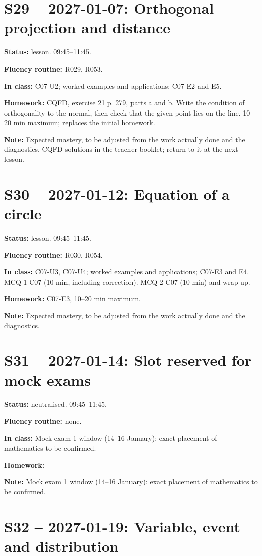 \section*{S29 -- 2027-01-07: Orthogonal projection and distance}
\textbf{Status:} lesson. 09:45–11:45.\par\textbf{Fluency routine:} R029, R053.\par\textbf{In class:} C07-U2; worked examples and applications; C07-E2 and E5. \par\textbf{Homework:} CQFD, exercise 21 p. 279, parts a and b. Write the condition of orthogonality to the normal, then check that the given point lies on the line. 10–20 min maximum; replaces the initial homework.\par\textbf{Note:} Expected mastery, to be adjusted from the work actually done and the diagnostics. CQFD solutions in the teacher booklet; return to it at the next lesson.
\section*{S30 -- 2027-01-12: Equation of a circle}
\textbf{Status:} lesson. 09:45–11:45.\par\textbf{Fluency routine:} R030, R054.\par\textbf{In class:} C07-U3, C07-U4; worked examples and applications; C07-E3 and E4.  MCQ 1 C07 (10 min, including correction). MCQ 2 C07 (10 min) and wrap-up.\par\textbf{Homework:} C07-E3, 10–20 min maximum.\par\textbf{Note:} Expected mastery, to be adjusted from the work actually done and the diagnostics.
\section*{S31 -- 2027-01-14: Slot reserved for mock exams}
\textbf{Status:} neutralised. 09:45–11:45.\par\textbf{Fluency routine:} none.\par\textbf{In class:} Mock exam 1 window (14–16 January): exact placement of mathematics to be confirmed.\par\textbf{Homework:} \par\textbf{Note:} Mock exam 1 window (14–16 January): exact placement of mathematics to be confirmed.
\section*{S32 -- 2027-01-19: Variable, event and distribution}
